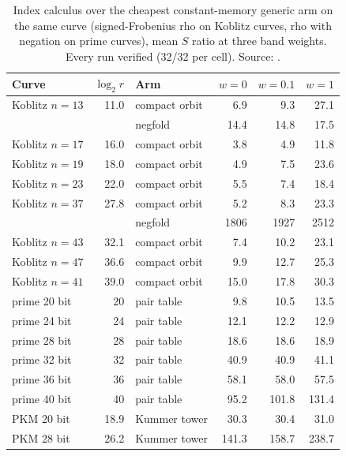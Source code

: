 \begin{table}[t]
\centering\small
\begin{tabular}{@{}lrlrrr@{}}
\toprule
Curve & $\log_2 r$ & Arm & $w=0$ & $w=0.1$ & $w=1$ \\
\midrule
Koblitz $n=13$ & 11.0 & compact orbit & 6.9 & 9.3 & 27.1 \\
               &      & negfold       & 14.4 & 14.8 & 17.5 \\
Koblitz $n=17$ & 16.0 & compact orbit & 3.8 & 4.9 & 11.8 \\
Koblitz $n=19$ & 18.0 & compact orbit & 4.9 & 7.5 & 23.6 \\
Koblitz $n=23$ & 22.0 & compact orbit & 5.5 & 7.4 & 18.4 \\
Koblitz $n=37$ & 27.8 & compact orbit & 5.2 & 8.3 & 23.3 \\
               &      & negfold       & 1806 & 1927 & 2512 \\
Koblitz $n=43$ & 32.1 & compact orbit & 7.4 & 10.2 & 23.1 \\
Koblitz $n=47$ & 36.6 & compact orbit & 9.9 & 12.7 & 25.3 \\
Koblitz $n=41$ & 39.0 & compact orbit & 15.0 & 17.8 & 30.3 \\
\addlinespace
prime 20 bit & 20 & pair table & 9.8 & 10.5 & 13.5 \\
prime 24 bit & 24 & pair table & 12.1 & 12.2 & 12.9 \\
prime 28 bit & 28 & pair table & 18.6 & 18.6 & 18.9 \\
prime 32 bit & 32 & pair table & 40.9 & 40.9 & 41.1 \\
prime 36 bit & 36 & pair table & 58.1 & 58.0 & 57.5 \\
prime 40 bit & 40 & pair table & 95.2 & 101.8 & 131.4 \\
\addlinespace
PKM 20 bit & 18.9 & Kummer tower & 30.3 & 30.4 & 31.0 \\
PKM 28 bit & 26.2 & Kummer tower & 141.3 & 158.7 & 238.7 \\
\bottomrule
\end{tabular}
\caption[]{Index calculus over the cheapest constant-memory generic arm on
the same curve (signed-Frobenius rho on Koblitz curves, rho with negation
on prime curves), mean $S$ ratio at three band weights. Every run verified
(32/32 per cell). Source:
.}
\label{tab:campaign}
\end{table}

